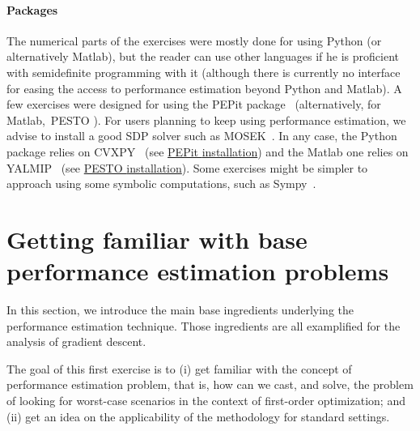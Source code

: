 \documentclass[11pt,a4paper]{article}
\newcommand{\pesto}{{PESTO }}
\newcommand{\pepit}{{PEPit }}
\begin{document}
\paragraph{Packages} The numerical parts of the exercises were mostly done for using Python (or alternatively Matlab), but the reader can use other languages if he is proficient with semidefinite programming with it (although there is currently no interface for easing the access to performance estimation beyond Python and Matlab). A few exercises were designed for using the \pepit package~\cite{goujaud2022pepit} (alternatively, for Matlab,~\pesto\cite{pesto2017}). For users planning to keep using performance estimation, we advise to install a good SDP solver such as MOSEK~\cite{mosek2010}. In any case, the Python package relies on CVXPY~\cite{diamond2016cvxpy} (see \href{https://github.com/PerformanceEstimation/PEPit}{\pepit installation}) and the Matlab one relies on YALMIP~\cite{Yalmip2004} (see \href{https://github.com/PerformanceEstimation/Performance-Estimation-Toolbox/wiki/Toolbox-(and-dependencies)-installation}{\pesto installation}). Some exercises might be simpler to approach using some symbolic computations, such as Sympy~\cite{meurer2017sympy}. 

	\section{Getting familiar with base performance estimation problems}	\label{s:pep_basis}	%
	In this section, we introduce the main base ingredients underlying the performance estimation technique. Those ingredients are all examplified for the analysis of gradient descent.
	
	The goal of this first exercise is to (i) get familiar with the concept of performance estimation problem, that is, how can we cast, and solve, the problem of looking for worst-case scenarios in the context of first-order optimization; and (ii) get an idea on the applicability of the methodology for standard settings.
	
\end{document}

